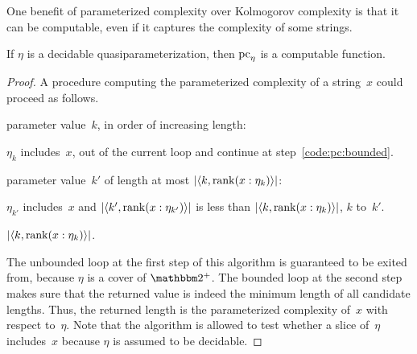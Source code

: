 One benefit of parameterized complexity over Kolmogorov complexity is that it can be computable, even if it captures the complexity of some strings.
\begin{lemma}
\label{lem:pccomputable}%
  If $\eta$ is a decidable quasiparameterization, then $\operatorname{pc}_\eta$ is a computable function.
\end{lemma}
\begin{proof}
  A procedure computing the parameterized complexity of a string~$x$ could proceed as follows.
  \begin{codelisting}
  \item
     parameter value~$k$, in order of increasing length:
    \begin{codelisting}
    \item
       $\eta_k$ includes~$x$,
      \itemcont {} out of the current loop and continue at step~\ref{code:pc:bounded}.
    \end{codelisting}
  \item\label{code:pc:bounded}%
     parameter value~$k'$ of length at most ${\lvert{\langle k, \operatorname{rank}(x : \eta_k)\rangle}\rvert}$:
    \begin{codelisting}
    \item
       $\eta_{k'}$ includes~$x$ and $\length{\pair{k'}{\rank(x : \eta_{k'})}}$ is less than $\length{\pair{k}{\rank(x : \eta_k)}}$,
      \itemcont {} $k$ to~$k'$.
    \end{codelisting}
    \item
       ${\lvert{\langle k, \operatorname{rank}(x : \eta_k)\rangle}\rvert}$.
  \end{codelisting}
  The unbounded loop at the first step of this algorithm is guaranteed to be exited from, because $\eta$ is a cover of $\binary^+$.
  The bounded loop at the second step makes sure that the returned value is indeed the minimum length of all candidate lengths.
  Thus, the returned length is the parameterized complexity of~$x$ with respect to~$\eta$.
  Note that the algorithm is allowed to test whether a slice of~$\eta$ includes~$x$ because $\eta$ is assumed to be decidable.
\end{proof}

